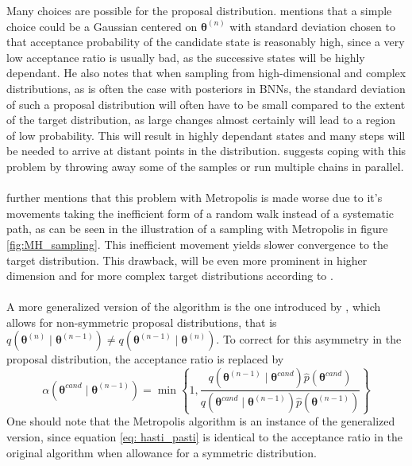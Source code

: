 Many choices are possible for the proposal distribution. \cite{neal2012bayesian} mentions that a simple choice could be a Gaussian centered on $\boldsymbol{\theta}^{(n)}$ with standard deviation chosen to that acceptance probability of the candidate state is reasonably high, since a very low acceptance ratio is usually bad, as the successive states will be highly dependant. He also notes that when sampling from high-dimensional and complex distributions, as is often the case with posteriors in BNNs, the standard deviation of such a proposal distribution will often have to be small compared to the extent of the target distribution, as large changes almost certainly will lead to a region of low probability. This will result in highly dependant states and many steps will be needed to arrive at distant points in the distribution. \cite{gelmanbda04} suggests coping with this problem by throwing away some of the samples or run multiple chains in parallel. \\
\\
\cite{neal2012bayesian} further mentions that this problem with Metropolis is made worse due to it's movements taking the inefficient form of a random walk instead of a systematic path, as can be seen in the illustration of a sampling with Metropolis in figure \ref{fig:MH_sampling}. This inefficient movement yields slower convergence to the target distribution. This drawback, will be even more prominent in higher dimension and for more complex target distributions according to \cite{gelmanbda04}. \\
\\
A more generalized version of the algorithm is the one introduced by \cite{hastings70}, which allows for non-symmetric proposal distributions, that is $q(\boldsymbol{\theta}^{(n)}\mid \boldsymbol{\theta}^{(n-1)}) \neq q(\boldsymbol{\theta}^{(n-1)}\mid \boldsymbol{\theta}^{(n)})$. To correct for this asymmetry in the proposal distribution, the acceptance ratio is replaced by
\begin{equation}\label{eq: hasti_pasti}
\alpha\left(\boldsymbol{\theta}^{c a n d} \mid \boldsymbol{\theta}^{(n-1)}\right)=\min \left\{1, \frac{q\left(\boldsymbol{\theta}^{(n-1)} \mid \boldsymbol{\theta}^{c a n d}\right) \hat{p}\left(\boldsymbol{\theta}^{c a n d}\right)}{q\left(\boldsymbol{\theta}^{c a n d} \mid \boldsymbol{\theta}^{(n-1)}\right) \hat{p}\left(\boldsymbol{\theta}^{(n-1)}\right)}\right\} 
\end{equation}
One should note that the Metropolis algorithm is an instance of the generalized version, since equation \ref{eq: hasti_pasti} is identical to the acceptance ratio in the original algorithm when allowance for a symmetric distribution. \\

